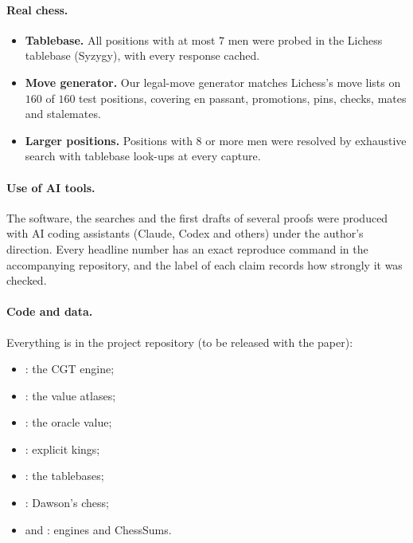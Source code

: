 \paragraph{Real chess.}
\begin{itemize}
\item \textbf{Tablebase.} All positions with at most $7$ men were probed in the Lichess tablebase (Syzygy),
  with every response cached.
\item \textbf{Move generator.} Our legal-move generator matches Lichess's move lists on $160$ of $160$ test
  positions, covering en passant, promotions, pins, checks, mates and stalemates.
\item \textbf{Larger positions.} Positions with $8$ or more men were resolved by exhaustive search with tablebase
  look-ups at every capture.
\end{itemize}

\paragraph{Use of AI tools.} The software, the searches and the first drafts of several proofs were produced
with AI coding assistants (Claude, Codex and others) under the author's direction. Every headline number has
an exact reproduce command in the accompanying repository, and the label of each claim records how strongly it
was checked.

\paragraph{Code and data.} Everything is in the project repository (to be released with the paper):
\begin{itemize}
\item {}: the CGT engine;
\item {}: the value atlases;
\item {}: the oracle value;
\item {}: explicit kings;
\item {}: the tablebases;
\item {}: Dawson's chess;
\item {} and : engines and ChessSums.
\end{itemize}
